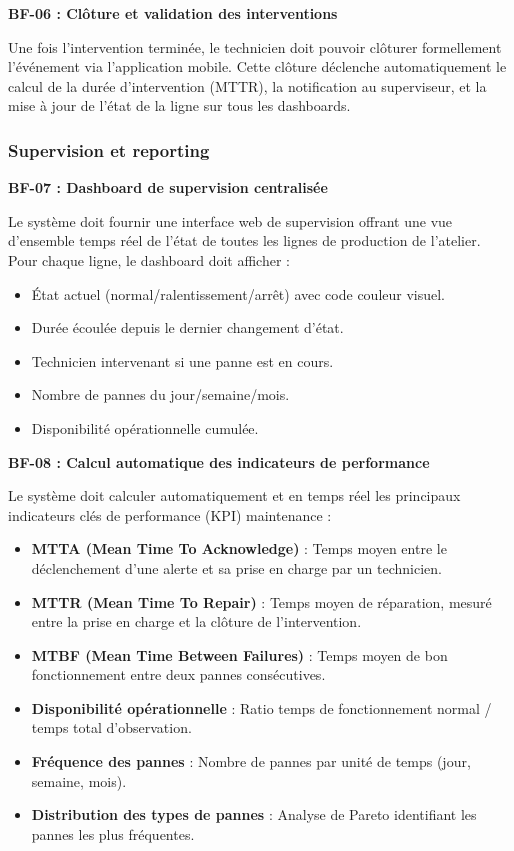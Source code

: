 \textbf{BF-06 : Clôture et validation des interventions}

Une fois l'intervention terminée, le technicien doit pouvoir clôturer formellement l'événement via l'application mobile. Cette clôture déclenche automatiquement le calcul de la durée d'intervention (MTTR), la notification au superviseur, et la mise à jour de l'état de la ligne sur tous les dashboards.

\subsubsection{Supervision et reporting}

\textbf{BF-07 : Dashboard de supervision centralisée}

Le système doit fournir une interface web de supervision offrant une vue d'ensemble temps réel de l'état de toutes les lignes de production de l'atelier. Pour chaque ligne, le dashboard doit afficher :

\begin{itemize}
    \item État actuel (normal/ralentissement/arrêt) avec code couleur visuel.
    \item Durée écoulée depuis le dernier changement d'état.
    \item Technicien intervenant si une panne est en cours.
    \item Nombre de pannes du jour/semaine/mois.
    \item Disponibilité opérationnelle cumulée.
\end{itemize}


\textbf{BF-08 : Calcul automatique des indicateurs de performance}

Le système doit calculer automatiquement et en temps réel les principaux indicateurs clés de performance (KPI) maintenance :

\begin{itemize}
    \item \textbf{MTTA (Mean Time To Acknowledge)} : Temps moyen entre le déclenchement d'une alerte et sa prise en charge par un technicien.
    \item \textbf{MTTR (Mean Time To Repair)} : Temps moyen de réparation, mesuré entre la prise en charge et la clôture de l'intervention.
    \item \textbf{MTBF (Mean Time Between Failures)} : Temps moyen de bon fonctionnement entre deux pannes consécutives.
    \item \textbf{Disponibilité opérationnelle} : Ratio temps de fonctionnement normal / temps total d'observation.
    \item \textbf{Fréquence des pannes} : Nombre de pannes par unité de temps (jour, semaine, mois).
    \item \textbf{Distribution des types de pannes} : Analyse de Pareto identifiant les pannes les plus fréquentes.
\end{itemize}

